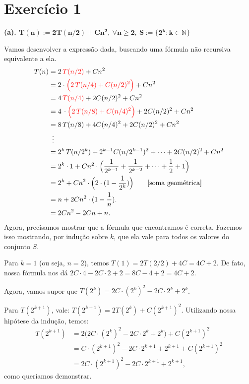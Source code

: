 \documentclass[a4paper]{article}
\begin{document}
\section*{Exercício 1}

\textbf{(a). $\bm{T(n) := 2T(n/2) + Cn^2, \: \forall n \ge 2, \: S:= \{ 2^k : k \in \mathbb N \} }$}

Vamos desenvolver a expressão dada, buscando uma fórmula não recursiva equivalente a ela.
\begin{align*}
    T(n) & = 2 \, \color{red} T(n/2) \color{black} + Cn^2 \\
    & = 2 \cdot \color{red} \Big( 2 \, T(n/4) + C(n/2)^2 \Big) \color{black} + Cn^2 \\
    & = 4 \, \color{red} T(n/4) \color{black} + 2C(n/2)^2 + Cn^2 \\
    & = 4 \, \cdot \color{red} \Big( 2 \, T(n/8) + C(n/4)^2 \Big) \color{black} + 2C(n/2)^2 + Cn^2 \\
    & = 8 \, T(n/8) + 4C(n/4)^2 + 2C(n/2)^2 + Cn^2 \\
    & \: \; \vdots \\
    & = 2^k \, T(n/2^k) + 2^{k-1}C(n/2^{k-1})^2 + \dots + 2C(n/2)^2 + Cn^2 \\
    & = 2^k \cdot 1 + Cn^2 \cdot \Big( \frac 1{2^{k-1}} + \frac 1{2^{k-2}} + \dots + \frac 12 + 1 \Big) \\
    & = 2^k + Cn^2 \cdot \Big( 2 \cdot (1-\frac 1{2^k}) \Big) \qquad \text{[soma geométrica]} \\
    & = n + 2Cn^2 \cdot (1-\frac 1n). \\
    & = 2Cn^2 - 2Cn + n.
\end{align*}
Agora, precisamos mostrar que a fórmula que encontramos é correta. Fazemos isso mostrando, por indução sobre $k$, que ela vale para todos os valores do conjunto $S$.

Para $k=1$ (ou seja, $n=2$), temos $T(1) = 2T(2/2) + 4C = 4C + 2$. De fato, nossa fórmula nos dá $2C \cdot 4 - 2C \cdot 2 + 2 = 8C -4 +2 = 4C + 2$.

Agora, vamos supor que $T(2^k) = 2C \cdot (2^k)^2 - 2C \cdot 2^k + 2^k$.

Para $T(2^{k+1})$, vale: $T(2^{k+1})=2T(2^k)+C(2^{k+1})^2$. Utilizando nossa hipótese da indução, temos:
\begin{align*}
    T(2^{k+1}) & =2 \Big( 2C \cdot (2^k)^2 - 2C \cdot 2^k + 2^k \Big) + C(2^{k+1})^2 \\
    & = C \cdot (2^{k+1})^2 - 2C \cdot 2^{k+1} + 2^{k+1} + C(2^{k+1})^2 \\
    & = 2C \cdot (2^{k+1})^2 - 2C \cdot 2^{k+1} + 2^{k+1},
\end{align*}
como queríamos demonstrar.
\end{document}
